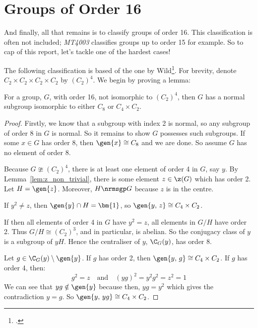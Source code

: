 \section{Groups of Order 16}
And finally, all that remains is to classify groups of order 16.
This classification is often not included; \textit{MT4003} classifies groups up to order 15 for example.
So to cap of this report, let's tackle one of the hardest cases!

The following classification is based of the one by Wild\footcite{order16}.
For brevity, denote \(C_2 \times C_2 \times C_2 \times C_2\) by \({(C_2)}^4\).
We begin by proving a lemma:

\begin{lemma}\label{lem:order_16_subgp}
    For a group, \(G\), with order 16, not isomorphic to \({(C_2)}^4\), then \(G\) has a
    normal subgroup isomorphic to either \(C_8\) or \(C_4 \times C_2\).
\end{lemma}

\begin{proof}
    Firstly, we know that a subgroup with index 2 is normal, so any subgroup of order 8 in \(G\) is normal.
    So it remains to show \(G\) possesses such subgroups.
    If some \(x \in G\) has order 8, then \(\gen{x} \cong C_8\) and we are done.
    So assume \(G\) has no element of order 8.

    Because \(G \ncong {(C_2)}^4\), there is at least one element of order 4 in \(G\), say \(y\).
    By Lemma~\ref{lem:z_non_trivial}, there is some element \(z \in \z(G)\) which has order 2.
    Let \(H = \gen{z}\).
    Moreover, \(H \nrmsgp G\) because \(z\) is in the centre.

    If \(y^2 \neq z\), then \(\gen{y} \cap H = \bm{1}\), so \(\gen{y,\,z} \cong C_4 \times C_2\).

    If then all elements of order 4 in \(G\) have \(y^2 = z\), all elements in \(G/H\) have order 2.
    Thus \(G/H \cong {(C_2)}^3\), and in particular, is abelian.
    So the conjugacy class of \(y\) is a subgroup of \(yH\).
    Hence the centraliser of \(y\), \(\C_G(y)\), has order 8.

    Let \(g \in \C_G(y) \setminus \gen{y}\).
    If \(g\) has order 2, then \(\gen{y,\,g} \cong C_4 \times C_2\).
    If \(g\) has order 4, then:
    \[g^2 = z \quad \text{and} \quad {(yg)}^2 = y^2 g^2 = z^2 = 1\]
    We can see that \(yg \notin \gen{y}\) because then, \(yg = y^2\) which gives the contradiction \(y = g\).
    So \(\gen{y,\,yg} \cong C_4 \times C_2\).
\end{proof}

